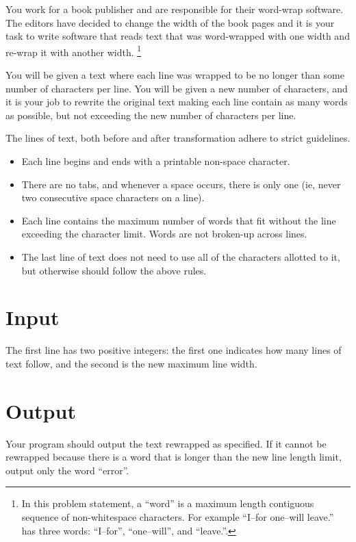 
\noindent
You work for a book publisher and are responsible for their word-wrap software. The editors have decided to change the width of the book pages and it is your task to write software that reads text  that was word-wrapped with one width and re-wrap it with another width.%
\footnote{In this problem statement, a ``word'' is a maximum length contiguous sequence of non-whitespace characters. For example ``I--for one--will leave.'' has three words: ``I--for'', ``one--will'', and ``leave.''.}

You will be given a text where each line was wrapped to be no longer than some number of characters per line. You will be given a new number of characters, and it is your job to rewrite the original text making each line contain as many words as possible, but not exceeding the new number of characters per line.

The lines of text, both before and after transformation adhere to strict guidelines.
%
\begin{itemize}
\item Each line begins and ends with a printable non-space character.
\item There are no tabs, and whenever a space occurs, there is only one (ie, never two consecutive space characters on a line).
\item Each line contains the maximum number of words that fit without the line exceeding the character limit. Words are not broken-up across lines.
\item The last line of text does not need to use all of the characters allotted to it, but otherwise should follow the above rules.
\end{itemize}

\section*{Input}

The first line has two positive integers: the first one indicates how many lines of text follow, and the second is the new maximum line width.


\section*{Output}

Your program should output the text rewrapped as specified. If it cannot be rewrapped because there is a word that is longer than the new line length limit, output only the word ``error''.

